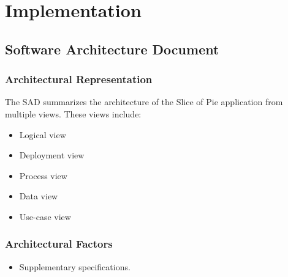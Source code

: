 \documentclass[11pt]{article}
\begin{document}
\section{Implementation}
\label{sec-4}
\subsection{Software Architecture Document}
\label{sec-4-1}
\subsubsection{Architectural Representation}
\label{sec-4-1-1}

The SAD summarizes the architecture of the Slice of Pie application from multiple views. These views include:
\begin{itemize}
\item Logical view
\item Deployment view
\item Process view
\item Data view
\item Use-case view
\end{itemize}
\subsubsection{Architectural Factors}
\label{sec-4-1-2}

\begin{itemize}
\item Supplementary specifications.
\end{itemize}
\end{document}
